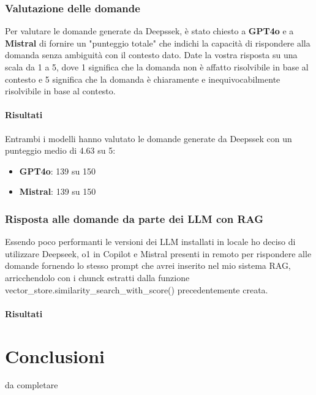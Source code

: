 \documentclass[12pt,a4paper,openright,twoside]{book}
\begin{document}
\subsection{Valutazione delle domande}
Per valutare le domande generate da Deepssek, è stato chiesto a \textbf{GPT4o} e a \textbf{Mistral} di 
fornire un "punteggio totale" che indichi la capacità di rispondere alla domanda senza ambiguità con il contesto dato.
Date la vostra risposta su una scala da 1 a 5, dove 1 significa che la domanda non è affatto risolvibile in base al contesto e 5 significa che la domanda è chiaramente e inequivocabilmente risolvibile in base al contesto.
\subsubsection{Risultati}
Entrambi i modelli hanno valutato le domande generate da Deepssek con un punteggio medio di 4.63 su 5:
\begin{itemize}
    \item \textbf{GPT4o}: 139 su 150
    \item \textbf{Mistral}: 139 su 150
\end{itemize}
\subsection{Risposta alle domande da parte dei LLM con RAG}
Essendo poco performanti le versioni dei LLM installati in locale ho deciso di utilizzare Deepseek, o1 in Copilot e Mistral 
presenti in remoto per rispondere alle domande fornendo lo stesso prompt che avrei inserito nel mio sistema RAG, arricchendolo con i chunck estratti dalla funzione vector_store.similarity_search_with_score() precedentemente creata.

\subsubsection{Risultati}
\chapter{Conclusioni}

da completare
\end{document}

